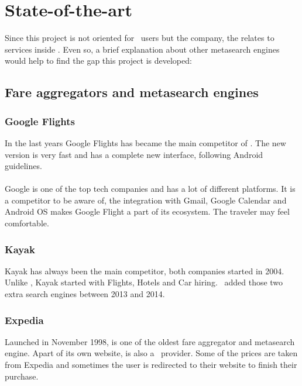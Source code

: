 
\chapter{State-of-the-art}

\label{chapter02}

Since this project is not oriented for \company\ users but the company, the \textit{} relates to services inside \company. Even so, a brief explanation about other metasearch engines would help to find the gap this project is developed:


\section{Fare aggregators and metasearch engines}

\subsection{Google Flights}

In the last years Google Flights has became the main competitor of \company. The new version is very fast and has a complete new interface, following Android guidelines.
\\\\
Google is one of the top tech companies and has a lot of different platforms. It is a competitor to be aware of, the integration with Gmail, Google Calendar and Android OS makes Google Flight a part of its ecosystem. The traveler may feel comfortable.

\subsection{Kayak}

Kayak has always been the main competitor, both companies started in 2004. Unlike \company, Kayak started with Flights, Hotels and Car hiring. \company\ added those two extra search engines between 2013 and 2014.

\subsection{Expedia}

Launched in November 1998, is one of the oldest fare aggregator and metasearch engine. Apart of its own website, is also a \company\ provider. Some of the prices are taken from Expedia and sometimes the user is redirected to their website to finish their purchase.

